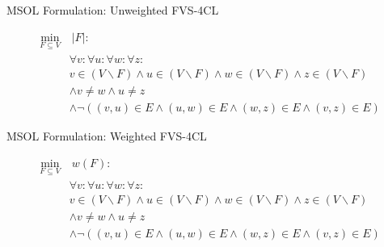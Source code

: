 \documentclass{beamer}
\begin{document}
\begin{frame}{MSOL Formulation: Unweighted FVS-4CL}

\begin{equation}
    \label{courcelle:unweighted}
    \begin{aligned}
        \min_{F \subseteq V} & \ |F|: \\
        & \forall v : \forall u : \forall w : \forall z : \\
        & v \in (V \backslash F) \land u \in (V \backslash F) \land w \in (V \backslash F) \land z \in (V \backslash F) \\
        & \land v \neq w \land u \neq z \\
        & \land \neg ((v, u) \in E \land (u, w) \in E \land (w, z) \in E \land (v, z) \in E)
    \end{aligned}
\end{equation}

\end{frame}

\begin{frame}{MSOL Formulation: Weighted FVS-4CL}

\begin{equation}
    \label{courcelle:weighted}
    \begin{aligned}
        \min_{F \subseteq V} & \ w(F): \\
        & \forall v : \forall u : \forall w : \forall z : \\
        & v \in (V \backslash F) \land u \in (V \backslash F) \land w \in (V \backslash F) \land z \in (V \backslash F) \\
        & \land v \neq w \land u \neq z \\
        & \land \neg((v, u) \in E \land (u, w) \in E \land (w, z) \in E \land (v, z) \in E)
    \end{aligned}
\end{equation}

\end{frame}
\end{document}
